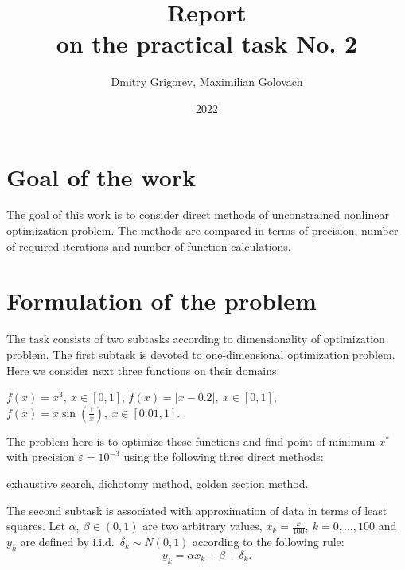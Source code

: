 \documentclass[12pt, bachelor, substylefile = algo_title.rtx]{disser}
\newcommand{\eps}{\varepsilon}
\theoremstyle{definition}
\begin{document}
\title{Report\\
on the practical task No. 2}


\author{Dmitry Grigorev, Maximilian Golovach}
\sastatus {}

\date{2022}

\maketitle
\section{Goal of the work}
The goal of this work is to consider direct methods of unconstrained nonlinear optimization problem. The methods are compared in terms of precision, number of required iterations and number of function calculations.

\section{Formulation of the problem}
\label{sec: probsetup}
The task consists of two subtasks according to dimensionality of optimization problem. The first subtask is devoted to one-dimensional optimization problem. Here we consider next three functions on their domains:
\begin{outline}[enumerate]
\1 $f(x) = x^3,\ x \in [0, 1]$,
\1 $f(x) = |x-0.2|,\ x\in [0, 1]$,
\1 $f(x) = x\sin\left(\frac{1}{x}\right),\ x\in [0.01, 1]$.
\end{outline}
The problem here is to optimize these functions and find point of minimum $x^*$ with precision $\eps = 10^{-3}$ using the following three direct methods:
\begin{outline}
\1 exhaustive search,
\1 dichotomy method,
\1 golden section method.
\end{outline}

The second subtask is associated with approximation of data in terms of least squares. Let $\alpha,\ \beta \in (0, 1)$ are two arbitrary values, $x_k = \frac{k}{100},\ k  = 0, \dots, 100$ and $y_k$ are defined by i.i.d.~$\delta_k \sim N(0, 1) $ according to the following rule:
\[ y_k = \alpha x_k + \beta + \delta_k.\]
\end{document}
